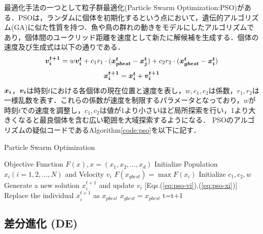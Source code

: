 \documentclass[a4j,11pt]{jarticle}
\begin{document}
最適化手法の一つとして粒子群最適化(Particle Swarm Optimization:PSO)がある．PSOは，ランダムに個体を初期化するという点において，遺伝的アルゴリズム(GA)に似た性質を持つ．魚や鳥の群れの動きをモデルにしたアルゴリズムであり，個体間のユークリッド距離を速度として新たに解候補を生成する．個体の速度及び生成式は以下の通りである．
\begin{equation}
\label{eq:pso-vi}
\mbox{\boldmath $v_i^{t+1}$}=w\mbox{\boldmath $v_i^t$}+c_1r_1 \cdot (\mbox{\boldmath $x_{pbest}^t$}-\mbox{\boldmath $x_j^t$})+c_2r_2 \cdot (\mbox{\boldmath $x_{gbest}^t$}-\mbox{\boldmath $x_i^t$})
\end{equation}
\begin{equation}
\label{eq:pso-xi}
\mbox{\boldmath $x_i^{t+1}$}=\mbox{\boldmath $x_i^t$}+\mbox{\boldmath $v_i^{t+1}$}
\end{equation}
$\mbox{\boldmath $x_i$}$，$\mbox{\boldmath $v_i$}$は時刻$t$における各個体の現在位置と速度を表し，$w,c_1,c_2$は係数，$r_1, r_2$は一様乱数を表す．これらの係数が速度を制限するパラメータとなっており，$w$が時刻$t$での速度を調整し，$c_1,c_2$は値が1より小さいほど局所探索を行い，1より大きくなると最良個体を含む広い範囲を大域探索するようになる．
PSOのアルゴリズムの疑似コードであるAlgorithm\ref{code:pso}を以下に記す．

\begin{algorithm}[H]
\caption{Particle Swarm Optimization}
\label{code:pso}
\begin{algorithmic}[2]
\REQUIRE Objective Function $F(x), x=(x_1,x_2,...,x_d)$
\STATE Initialize Population $x_i (i=1,2,...,N)$ and Velocity $v_i$
\STATE $F(x_{gbest})=\max{F(x_i)}$
\STATE Initialize $c_1,c_2,w$
\STATE Generate a new solution $x_i^{t+1}$ and update $v_i$ [Eqs.(\ref{eq:pso-vi}),(\ref{eq:pso-xi})]
\STATE Replace the individual $x_i^{t+1}$ as $x_{pbest}$
\ENDIF
{}
\STATE $x_{gbest}=x_{pbest}$
\ENDIF
\ENDFOR
\STATE t=t+1
\ENDWHILE
\end{algorithmic}
\end{algorithm}

\subsection{差分進化 (DE)}
\label{ss:DE}

  \makeatletter
  \renewcommand{\theequation}{\arabic{section}-\arabic{subsection}-\arabic{equation}}
  \makeatother
\end{document}
